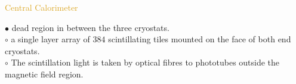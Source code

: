 \begin{frame}{\textcolor{Goldenrod}{Central Calorimeter}}
\begin{overlayarea}{\textwidth}{\textheight}
  \item[$\bullet$] dead region in between the three cryostats.\\
    $\circ$ a single layer array of $384$ scintillating tiles mounted on the
    face of both end cryostats.\\
    $\circ$ The scintillation light is taken by optical fibres to
    phototubes outside the magnetic field region.
    
    
    \tti
  \end{overlayarea}
\end{frame}

    
    
    
      
      
